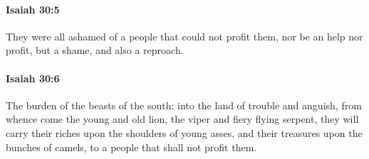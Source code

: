 		\paragraph{Isaiah 30:5} %
			\label{ISAIAH-30-5}

			They were all ashamed of a people that could not profit them, nor be an help nor profit, but a shame, and also a reproach.


		\paragraph{Isaiah 30:6} %
			\label{ISAIAH-30-6}

			The burden of the beasts of the south: into the land of trouble and anguish, from whence come the young and old lion, the viper and fiery flying serpent, they will carry their riches upon the shoulders of young asses, and their treasures upon the bunches of camels, to a people that shall not profit them.

